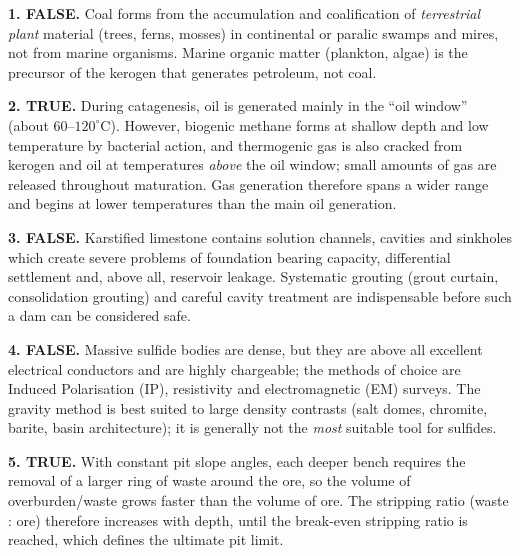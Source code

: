 \documentclass[11pt]{article}
\newcommand{\cle}[1]{{\popxbold\color{popdark}#1}}
\begin{document}
\begin{corrige}
\textbf{1. FALSE.} Coal forms from the accumulation and coalification of \emph{terrestrial plant} material (trees, ferns, mosses) in continental or paralic swamps and mires, not from marine organisms. Marine organic matter (plankton, algae) is the precursor of the kerogen that generates petroleum, not coal.

\textbf{2. TRUE.} During catagenesis, oil is generated mainly in the ``oil window'' (about $60$--$120^\circ$C). However, biogenic methane forms at shallow depth and low temperature by bacterial action, and thermogenic gas is also cracked from kerogen and oil at temperatures \emph{above} the oil window; small amounts of gas are released throughout maturation. Gas generation therefore spans a wider range and begins at lower temperatures than the main oil generation.

\textbf{3. FALSE.} Karstified limestone contains solution channels, cavities and sinkholes which create severe problems of foundation bearing capacity, differential settlement and, above all, reservoir leakage. Systematic \cle{grouting} (grout curtain, consolidation grouting) and careful cavity treatment are indispensable before such a dam can be considered safe.

\textbf{4. FALSE.} Massive sulfide bodies are dense, but they are above all excellent electrical conductors and are highly chargeable; the methods of choice are \cle{Induced Polarisation (IP)}, resistivity and electromagnetic (EM) surveys. The gravity method is best suited to large density contrasts (salt domes, chromite, barite, basin architecture); it is generally not the \emph{most} suitable tool for sulfides.

\textbf{5. TRUE.} With constant pit slope angles, each deeper bench requires the removal of a larger ring of waste around the ore, so the volume of overburden/waste grows faster than the volume of ore. The \cle{stripping ratio} (waste : ore) therefore increases with depth, until the \cle{break-even stripping ratio} is reached, which defines the ultimate pit limit.
\end{corrige}
\end{document}
